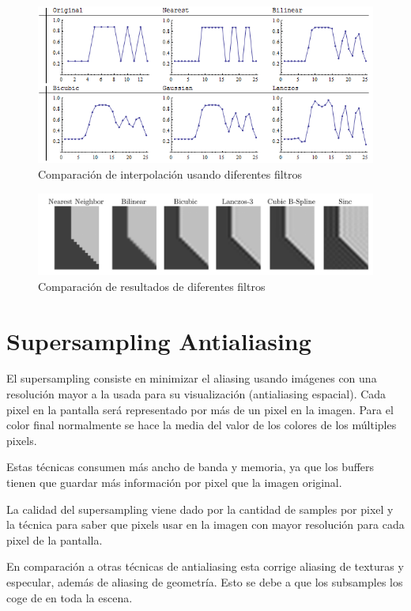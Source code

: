 \documentclass[withindex, glossary]{cam-thesis}
\begin{document}
\begin{figure}[!htb]
    \includegraphics[width=\linewidth]{figures/Lw6ei.png}
    \caption{Comparación de interpolación usando diferentes filtros\cite{gis}}
    \label{gls}
\end{figure}

\begin{figure}[!htb]
    \includegraphics[width=\linewidth]{figures/comparison-filter.png}
    \caption{Comparación de resultados de diferentes filtros\cite{resampling2}}
\end{figure}

\section{Supersampling Antialiasing}

El supersampling consiste en minimizar el aliasing usando imágenes con una resolución mayor a la usada para su visualización (antialiasing espacial). Cada pixel en la pantalla será representado por más de un pixel en la imagen. Para el color final normalmente se hace la media del valor de los colores de los múltiples pixels.

Estas técnicas consumen más ancho de banda y memoria, ya que los buffers tienen que guardar más información por pixel que la imagen original.

La calidad del supersampling viene dado por la cantidad de samples por pixel y la técnica para saber que pixels usar en la imagen con mayor resolución para cada pixel de la pantalla.

En comparación a otras técnicas de antialiasing esta corrige aliasing de texturas y especular, además de aliasing de geometría. Esto se debe a que los subsamples los coge de en toda la escena.
\end{document}
